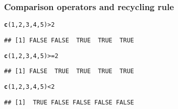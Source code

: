 \documentclass[12pt]{beamer}\usepackage[]{graphicx}\usepackage[]{color}
\makeatletter
\newcommand{\hlnum}[1]{\textcolor[rgb]{0.686,0.059,0.569}{#1}}%
\newcommand{\hlopt}[1]{\textcolor[rgb]{0,0,0}{#1}}%
\newcommand{\hlstd}[1]{\textcolor[rgb]{0.345,0.345,0.345}{#1}}%
\newcommand{\hlkwd}[1]{\textcolor[rgb]{0.737,0.353,0.396}{\textbf{#1}}}%
\newenvironment{kframe}{%
 \def\at@end@of@kframe{}%
 \ifinner\ifhmode%
  \def\at@end@of@kframe{\end{minipage}}%
  \begin{minipage}{\columnwidth}%
 \fi\fi%
 \def\FrameCommand##1{\hskip\@totalleftmargin \hskip-\fboxsep
 \colorbox{shadecolor}{##1}\hskip-\fboxsep
     \hskip-\linewidth \hskip-\@totalleftmargin \hskip\columnwidth}%
 \MakeFramed {\advance\hsize-\width
   \@totalleftmargin\z@ \linewidth\hsize
   \@setminipage}}%
 {\par\unskip\endMakeFramed%
 \at@end@of@kframe}
\newenvironment{knitrout}{}{} %
\makeatother
\begin{document}
\begin{frame}[fragile]
\frametitle{Comparison operators and recycling rule}

\begin{knitrout}\footnotesize
{}\color{fgcolor}\begin{kframe}
\begin{alltt}
\hlkwd{c}\hlstd{(}\hlnum{1}\hlstd{,} \hlnum{2}\hlstd{,} \hlnum{3}\hlstd{,} \hlnum{4}\hlstd{,} \hlnum{5}\hlstd{)} \hlopt{>} \hlnum{2}
\end{alltt}
\begin{verbatim}
## [1] FALSE FALSE  TRUE  TRUE  TRUE
\end{verbatim}
\begin{alltt}
\hlkwd{c}\hlstd{(}\hlnum{1}\hlstd{,} \hlnum{2}\hlstd{,} \hlnum{3}\hlstd{,} \hlnum{4}\hlstd{,} \hlnum{5}\hlstd{)} \hlopt{>=} \hlnum{2}
\end{alltt}
\begin{verbatim}
## [1] FALSE  TRUE  TRUE  TRUE  TRUE
\end{verbatim}
\begin{alltt}
\hlkwd{c}\hlstd{(}\hlnum{1}\hlstd{,} \hlnum{2}\hlstd{,} \hlnum{3}\hlstd{,} \hlnum{4}\hlstd{,} \hlnum{5}\hlstd{)} \hlopt{<} \hlnum{2}
\end{alltt}
\begin{verbatim}
## [1]  TRUE FALSE FALSE FALSE FALSE
\end{verbatim}
\end{kframe}
\end{knitrout}

\end{frame}

\end{document}
